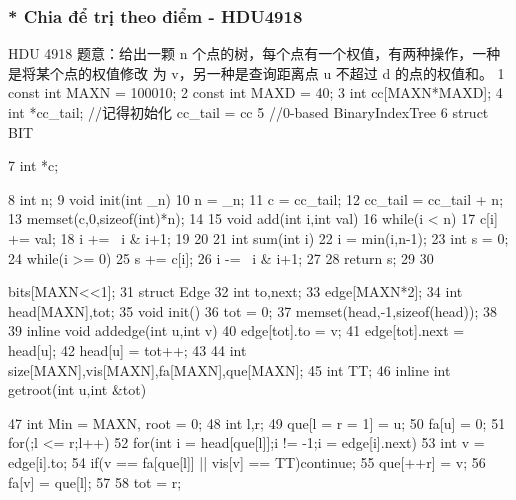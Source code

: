 \documentclass[11pt]{article}
\begin{document}
\subsubsection{* Chia để trị theo điểm - HDU4918}

\begin{Code}
      HDU 4918
      题意：给出一颗 n 个点的树，每个点有一个权值，有两种操作，一种是将某个点的权值修改
      为 v，另一种是查询距离点 u 不超过 d 的点的权值和。
 1    const int MAXN = 100010;
 2    const int MAXD = 40;
 3    int cc[MAXN*MAXD];
 4    int *cc_tail; //记得初始化 cc_tail = cc
 5    //0-based BinaryIndexTree
 6    struct BIT{
 7        int *c;


 8       int n;
 9       void init(int _n){
10           n = _n;
11           c = cc_tail;
12           cc_tail = cc_tail + n;
13           memset(c,0,sizeof(int)*n);
14       }
15       void add(int i,int val){
16           while(i < n){
17                c[i] += val;
18                i += ~i & i+1;
19           }
20       }
21       int sum(int i){
22           i = min(i,n-1);
23           int s = 0;
24           while(i >= 0){
25                s += c[i];
26                i -= ~i & i+1;
27           }
28           return s;
29       }
30   }bits[MAXN<<1];
31   struct Edge{
32       int to,next;
33   }edge[MAXN*2];
34   int head[MAXN],tot;
35   void init(){
36       tot = 0;
37       memset(head,-1,sizeof(head));
38   }
39   inline void addedge(int u,int v){
40       edge[tot].to = v;
41       edge[tot].next = head[u];
42       head[u] = tot++;
43   }
44   int size[MAXN],vis[MAXN],fa[MAXN],que[MAXN];
45   int TT;
46   inline int getroot(int u,int &tot){
47       int Min = MAXN, root = 0;
48       int l,r;
49       que[l = r = 1] = u;
50       fa[u] = 0;
51       for(;l <= r;l++)
52           for(int i = head[que[l]];i != -1;i = edge[i].next){
53                int v = edge[i].to;
54                if(v == fa[que[l]] || vis[v] == TT)continue;
55                que[++r] = v;
56                fa[v] = que[l];
57           }
58       tot = r;


}
\end{Code}
\end{document}
